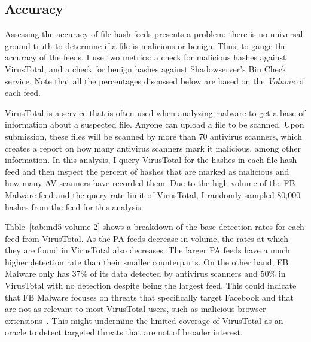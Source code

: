 \subsection{Accuracy}
\label{sec:hash-accuracy}
Assessing the accuracy of file hash feeds presents a problem: there is no
universal ground truth to determine if a file is malicious or benign. Thus,
to gauge the accuracy of the feeds, I use two metrics: a check for malicious
hashes against VirusTotal, and a check for benign hashes against Shadowserver's
Bin Check service. Note that all the percentages discussed below are based on
the \textit{Volume} of each feed.


VirusTotal is a service that is often used when analyzing
malware to get a base of information about a suspected file.
Anyone can upload a file to be scanned. Upon submission, these files will be
scanned by more than 70 antivirus scanners, which creates a report on how many
antivirus scanners mark it malicious, among other information. In this analysis,
I query VirusTotal for the hashes in each file hash feed and then inspect the
percent of hashes that are marked as malicious and how many AV scanners have
recorded them. Due to the high volume of the FB Malware feed and the query
rate limit of VirusTotal, I randomly sampled 80,000 hashes from the feed for
this analysis.

Table~\ref{tab:md5-volume-2} shows a breakdown of the base detection rates 
for
each feed from VirusTotal. As the PA feeds decrease in volume, the rates at
which they are found in VirusTotal also decreases. The larger PA feeds have a
much higher detection rate than their smaller counterparts. On the other hand,
FB Malware only has 37\% of its data detected by antivirus scanners and 50\% in
VirusTotal with no detection despite being the largest feed. This could indicate
that FB Malware focuses on threats that specifically target Facebook and that
are not as relevant to most VirusTotal users, such as malicious browser
extensions~\cite{dekoven2017malicious, jagpal2015trends, kapravelos2014hulk}.
This might undermine the limited coverage of VirusTotal as an oracle to detect
targeted threats that are not of broader interest.

